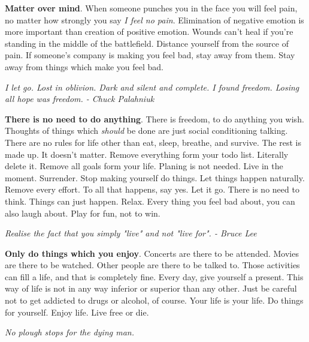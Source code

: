 \documentclass[a4paper,hidelinks]{article}
\begin{document}
\textbf{Matter over mind}.
When someone punches you in the face you will feel pain, no matter how strongly you say \textit{I feel no pain}.
Elimination of negative emotion is more important than creation of positive emotion.
Wounds can't heal if you're standing in the middle of the battlefield.
Distance yourself from the source of pain.
If someone's company is making you feel bad, stay away from them.
Stay away from things which make you feel bad.

\newpage

\begin{center}
\textit{
I let go.  Lost in oblivion.  Dark and silent and complete.  I found freedom.  Losing all hope was freedom. - Chuck Palahniuk
}
\end{center}

\textbf{There is no need to do anything}.
There is freedom, to do anything you wish.
Thoughts of things which \textit{should} be done are just social conditioning talking.
There are no rules for life other than eat, sleep, breathe, and survive.
The rest is made up.
It doesn't matter.
Remove everything form your todo list.
Literally delete it.
Remove all goals form your life.
Planing is not needed.
Live in the moment.
Surrender.
Stop making yourself do things.
Let things happen naturally.
Remove every effort.
To all that happens, say yes.
Let it go.
There is no need to think.
Things can just happen.
Relax.
Every thing you feel bad about, you can also laugh about.
Play for fun, not to win.

\newpage

\begin{center}
\textit{
Realise the fact that you simply "live" and not "live for". - Bruce Lee
}
\end{center}

\textbf{Only do things which you enjoy}.
Concerts are there to be attended.
Movies are there to be watched.
Other people are there to be talked to.
Those activities can fill a life, and that is completely fine.
Every day, give yourself a present.
This way of life is not in any way inferior or superior than any other.
Just be careful not to get addicted to drugs or alcohol, of course.
Your life is your life.
Do things for yourself.
Enjoy life.
Live free or die.

\newpage

\begin{center}
\textit{
No plough stops for the dying man.
}
\end{center}
\end{document}
